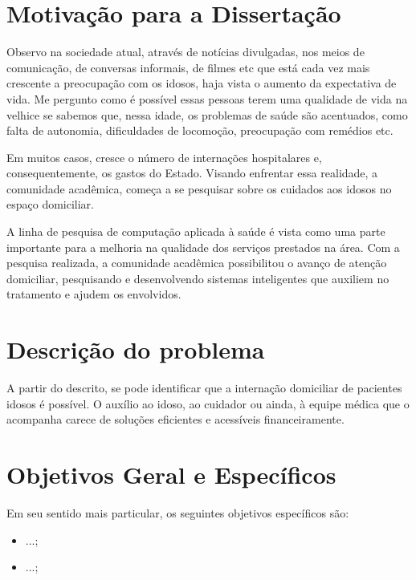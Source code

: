 \section{Motivação para a Dissertação}\label{sec:motivacao}

Observo na sociedade atual, através de notícias divulgadas, nos meios
de comunicação, de conversas informais, de filmes etc que está cada
vez mais crescente a preocupação com os idosos, haja vista o
aumento da expectativa de vida. Me pergunto como é possível essas pessoas
terem uma qualidade de vida na velhice se sabemos que, nessa idade,
os problemas de saúde são acentuados, como falta de autonomia,
dificuldades de locomoção, preocupação com remédios etc.

Em muitos casos, cresce o número de internações hospitalares e,
consequentemente, os gastos do Estado. Visando enfrentar essa 
realidade, a comunidade acadêmica, %
começa a se pesquisar sobre os cuidados aos idosos no espaço domiciliar.

A linha de pesquisa de computação aplicada à saúde é vista como uma parte
importante para a melhoria na qualidade dos serviços prestados na área.
Com a pesquisa realizada, a comunidade acadêmica possibilitou o avanço
de atenção domiciliar, pesquisando e desenvolvendo sistemas inteligentes
que auxiliem no tratamento e ajudem os envolvidos.

\section{Descrição do problema}\label{sec:descricao-problema}



A partir do descrito, se pode identificar que a internação domiciliar
de pacientes idosos é possível. O auxílio ao idoso, ao cuidador
ou ainda, à equipe médica que o acompanha carece de soluções eficientes
e acessíveis financeiramente.

\section{Objetivos Geral e Específicos}\label{sec:objetivos}

Em seu sentido mais particular, os seguintes objetivos específicos são:

\begin{itemize}
	\item ...; 
	\item ...;
\end{itemize}

